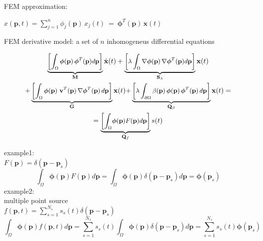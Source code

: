 \documentclass{beamer}
\newcommand{\mb}{\mathbf}
\newcommand{\bs}{\boldsymbol}
\begin{document}
\begin{frame}

FEM approximation:\\
\begin{center}

$	x(\mb{p},t) = \sum_{j=1}^{n} \phi_{j}(\mb{p}) \, x_j(t) ~=~ \boldsymbol{\phi}^T(\mb{p}) \, \mb{x}(t)$

\end{center}
\vspace{0.1cm}

FEM derivative model:
a set of $n$ inhomogeneus differential equations

\begin{multline} 
\small{\underbrace{\left[ \int_\Omega  
			\bs{\phi}(\mb{p}) \,\bs{\phi}^T(\mb{p}) d\mb{p} 
			\right]}_{\mb{M}} \dot{\mb{x}}(t)  + 
		\underbrace{\left[ \lambda \int_\Omega 
			\nabla	\bs{\phi}(\mb{p}) \,\nabla \bs{\phi}^T(\mb{p}) d\mb{p} 
			\right]}_{\mb{S}_\lambda} \mb{x}(t) }\\
\small{+ \underbrace{\left[ \int_\Omega 
			\bs{\phi}(\mb{p}) ~ \mb{v}^T(\mb{p}) \,\nabla \bs{\phi}^T(\mb{p}) \, d\mb{p} 
			\right]}_{\mb{G}} \mb{x}(t) }
	\small{+ \underbrace{\left[ \lambda \int_{\partial \Omega} 
			\beta(\mb{p}) \, \bs{\phi}(\mb{p}) \,\bs{\phi}^T(\mb{p}) \, d\mb{p}
			\right]}_{\mb{Q}_\beta} \mb{x}(t) = }\\
	=  \small{\underbrace{\left[\displaystyle{\int_\Omega} \bs{\phi}(\mb{p})
			F(\mb{p}) d\mb{p}	\right]}_{\mb{Q}_f} {s}(t) }
\end{multline} 
\end{frame}
\begin{frame}
example1: \\
$F(\mb{p})=\delta(\mb{p}-\mb{p}_s)$\\
$$\int_\Omega \bs{\phi}(\mb{p})
			F(\mb{p}) d\mb{p} = \int_\Omega \bs{\phi}(\mb{p})
			\delta(\mb{p}-\mb{p}_s) d\mb{p}=\bs{\phi}(\mb{p}_s)$$
example2:\\
multiple point source\\
\vspace{1mm}
$f(\mb{p},t)=\sum_{s=1}^{N_s} s_s(t) \delta(\mb{p}-\mb{p}_s)$\\
$$\int_\Omega \bs{\phi}(\mb{p})
			f(\mb{p},t) d\mb{p} = \sum_{s=1}^{N_s} s_s(t) \int_\Omega \bs{\phi}(\mb{p})
			\delta(\mb{p}-\mb{p}_s) d\mb{p}= \sum_{s=1}^{N_s} s_s(t) \bs{\phi}(\mb{p}_s)$$\\
\end{frame}
\end{document}
